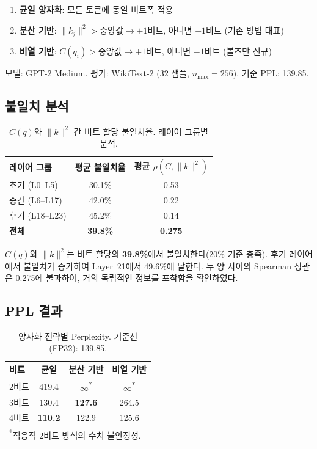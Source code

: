 \documentclass[11pt,a4paper]{article}
\begin{document}
\begin{enumerate}[nosep]
  \item \textbf{균일 양자화}: 모든 토큰에 동일 비트폭 적용
  \item \textbf{분산 기반}: $\|k_j\|^2 > \text{중앙값} \to +1$비트, 아니면 $-1$비트 (기존 방법 대표)
  \item \textbf{비열 기반}: $C(q_i) > \text{중앙값} \to +1$비트, 아니면 $-1$비트 (볼츠만 신규)
\end{enumerate}

모델: GPT-2 Medium. 평가: WikiText-2 (32 샘플, $n_\mathrm{max}=256$). 기준 PPL: 139.85.

\subsection{불일치 분석}

\begin{table}[H]
\centering
\caption{$C(q)$와 $\|k\|^2$ 간 비트 할당 불일치율. 레이어 그룹별 분석.}
\label{tab:disagree}
\begin{tabular}{lcc}
\toprule
\textbf{레이어 그룹} & \textbf{평균 불일치율} & \textbf{평균 $\rho(C, \|k\|^2)$} \\
\midrule
초기 (L0--L5) & 30.1\% & 0.53 \\
중간 (L6--L17) & 42.0\% & 0.22 \\
후기 (L18--L23) & 45.2\% & 0.14 \\
\midrule
\textbf{전체} & \textbf{39.8\%} & \textbf{0.275} \\
\bottomrule
\end{tabular}
\end{table}

$C(q)$와 $\|k\|^2$는 비트 할당의 \textbf{39.8\%}에서 불일치한다(20\% 기준 충족). 후기 레이어에서 불일치가 증가하여 Layer~21에서 49.6\%에 달한다. 두 양 사이의 Spearman 상관은 0.275에 불과하여, 거의 독립적인 정보를 포착함을 확인하였다.

\subsection{PPL 결과}

\begin{table}[H]
\centering
\caption{양자화 전략별 Perplexity. 기준선 (FP32): 139.85.}
\label{tab:ppl}
\begin{tabular}{lccc}
\toprule
\textbf{비트} & \textbf{균일} & \textbf{분산 기반} & \textbf{비열 기반} \\
\midrule
2비트 & 419.4 & $\infty$\textsuperscript{*} & $\infty$\textsuperscript{*} \\
3비트 & 130.4 & \textbf{127.6} & 264.5 \\
4비트 & \textbf{110.2} & 122.9 & 125.6 \\
\bottomrule
\multicolumn{4}{l}{\footnotesize \textsuperscript{*}적응적 2비트 방식의 수치 불안정성.}
\end{tabular}
\end{table}
\end{document}
